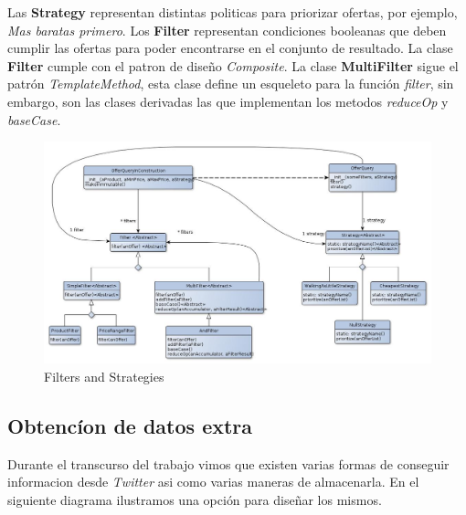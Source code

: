 \documentclass[10pt, a4paper]{article}
\begin{document}
\begin{landscape}
Las \textbf{Strategy} representan distintas politicas para priorizar ofertas, por ejemplo, \emph{Mas baratas primero}. Los \textbf{Filter} representan condiciones booleanas que deben cumplir las ofertas para poder encontrarse en el conjunto de resultado. La clase \textbf{Filter} cumple con el patron de diseño \emph{Composite}. La clase \textbf{MultiFilter} sigue el patrón \emph{TemplateMethod}, esta clase define un esqueleto para la función \emph{filter}, sin embargo, son las clases derivadas las que implementan los metodos \emph{reduceOp} y \emph{baseCase}.

\begin{figure}[H]
\centering
\includegraphics[scale=0.6]{graphics/filter_class.jpg}
\caption{Filters and Strategies}
\end{figure}

\end{landscape}
\newpage
\subsection{Obtenc\'ion de datos extra}
Durante el transcurso del trabajo vimos que existen varias formas de conseguir informacion desde \emph{Twitter} asi como varias maneras de almacenarla. En el siguiente diagrama ilustramos una opci\'on para diseñar los mismos.
\end{document}
